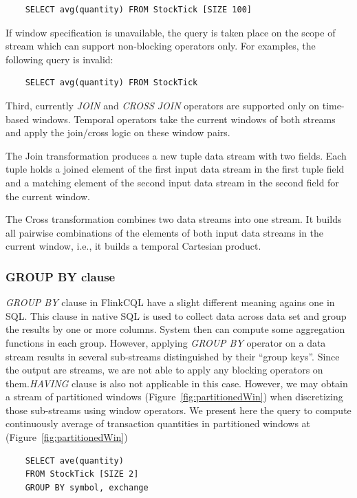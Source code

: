 \begin{verbatim}
	SELECT avg(quantity) FROM StockTick [SIZE 100]
\end{verbatim}

If window specification is unavailable, the query is taken place on the scope of stream which can support non-blocking operators only. For examples, the following query is invalid:
\begin{lstlisting}
	SELECT avg(quantity) FROM StockTick
\end{lstlisting}

Third, currently \textit{JOIN} and \textit{CROSS JOIN} operators are supported only on time-based windows. Temporal operators take the current windows of both streams and apply the join/cross logic on these window pairs.

The Join transformation produces a new tuple data stream with two fields. Each tuple holds a joined element of the first input data stream in the first tuple field and a matching element of the second input data stream in the second field for the current window.

The Cross transformation combines two data streams into one stream. It builds all pairwise combinations of the elements of both input data streams in the current window, i.e., it builds a temporal Cartesian product.


\subsubsection*{GROUP BY clause}
\textit{GROUP BY} clause in FlinkCQL have a slight different meaning agains one in SQL. This clause in native SQL is used to collect data across data set and group the results by one or more columns. System then can compute some aggregation functions in each group. However, applying \textit{GROUP BY} operator on a data stream results in several sub-streams distinguished by their ``group keys''. Since the output are streams, we are not able to apply any blocking operators on them.\textit{HAVING} clause is also not applicable in this case. However,  we may obtain a stream of partitioned windows (Figure~\ref{fig:partitionedWin}) when discretizing those sub-streams using window operators. We present here the query to compute continuously average of transaction quantities in partitioned windows at  (Figure~\ref{fig:partitionedWin})
\begin{lstlisting}
	SELECT ave(quantity)
	FROM StockTick [SIZE 2]
	GROUP BY symbol, exchange
\end{lstlisting}


